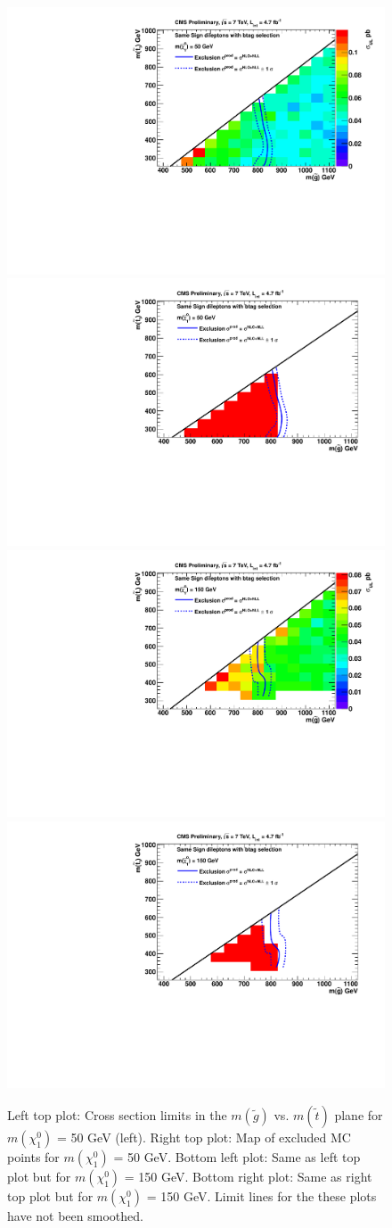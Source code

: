 \begin{figure}[htb]
\begin{center}
\includegraphics[width=0.49\linewidth]{figs/GlStop_50_LimitsOnCarpet.pdf}
\includegraphics[width=0.49\linewidth]{figs/GlStop_50_ExcludedRegionMap.pdf}
\includegraphics[width=0.49\linewidth]{figs/GlStop_150_LimitsOnCarpet.pdf}
\includegraphics[width=0.49\linewidth]{figs/GlStop_150_ExcludedRegionMap.pdf}
\caption{Left top plot: Cross section limits in the $m(\widetilde{g})$ 
vs. $m(\widetilde{t})$ plane
for $m(\chi_1^0)$ = 50 GeV (left).
Right top plot: Map of excluded MC points for 
$m(\chi_1^0)$ = 50 GeV.
Bottom left plot: Same as left top plot but for $m(\chi_1^0)$ = 150 GeV.
Bottom right plot: Same as right top plot but for $m(\chi_1^0)$ = 150 GeV.
Limit lines for the these plots have not been smoothed. 
\label{fig:mglinoStop}}
\end{center}
\end{figure}

